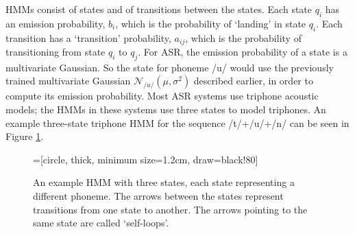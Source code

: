 HMMs consist of states and of transitions between the states.  Each state $q_i$ has an emission probability, $b_i$, which is the probability of `landing' in state $q_i$. %
Each transition has a `transition' probability, $a_{ij}$, which is the probability of transitioning from state $q_i$ to $q_j$.  For ASR, the emission probability of a state is a multivariate Gaussian.  So the state for phoneme /u/ would use the previously trained multivariate Gaussian $\mathcal{N}_{/u/}(\mu,\sigma^2)$ described earlier, in order to compute its emission probability.  Most ASR systems use triphone acoustic models; the HMMs in these systems use three states to model triphones.  An example three-state triphone HMM for the sequence /t/+/u/+/n/ can be seen in Figure \ref{fig:hmm-sounds}.  

\begin{figure}[H]
\centering
{}=[circle,
                                    thick,
                                    minimum size=1.2cm,
                                    draw=black!80]


\caption{An example HMM with three states, each state representing a different phoneme.  The arrows between the states represent transitions from one state to another.  The arrows pointing to the same state are called `self-loops'.}\label{fig:hmm-sounds}
\end{figure}

